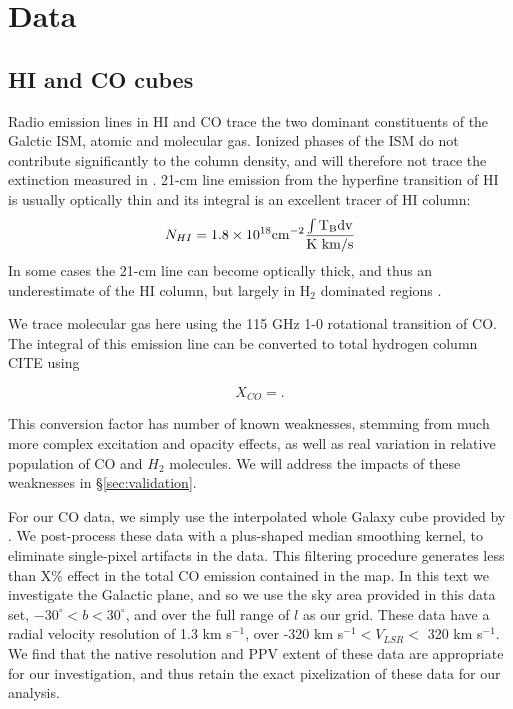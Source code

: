 \section{Data}
\label{sec:data}
\subsection{HI and CO cubes}

Radio emission lines in HI and CO trace the two dominant constituents of the Galctic ISM, atomic and molecular gas. Ionized phases of the ISM do not contribute significantly to the column density, and will therefore not trace the extinction measured in \cite{Green_2015}. 21-cm line emission from the hyperfine transition of HI is usually optically thin and its integral is an excellent tracer of HI column:
\begin{equation}\label{XHI}
N_{HI} = 1.8 \times 10^{18} \rm cm^{-2} \frac{ \int T_B dv}{\rm K~km/s}
\end{equation}
In some cases the 21-cm line can become optically thick, and thus an underestimate of the HI column, but largely in H$_2$ dominated regions \cite{Goldsmith_2007}. 

We trace molecular gas here using the 115 GHz 1-0 rotational transition of CO. The integral of this emission line can be converted to total hydrogen column CITE using

\begin{equation}\label{XCO}
X_{CO} = .
\end{equation}

This conversion factor has number of known weaknesses, stemming from much more complex excitation and opacity effects, as well as real variation in relative population of CO and $H_2$ molecules. We will address the impacts of these weaknesses in \S \ref{sec:validation}. 

For our CO data, we simply use the interpolated whole Galaxy cube provided by \cite{Dame_2001}. We post-process these data with a plus-shaped median smoothing kernel, to eliminate single-pixel artifacts in the data. This filtering procedure generates less than X\% effect in the total CO emission contained in the map. In this text we investigate the Galactic plane, and so we use the sky area provided in this data set, $-30^\circ < b < 30^\circ$, and over the full range of $l$ as our grid. These data have a radial velocity resolution of 1.3 km s$^{-1}$, over -320 km s$^{-1} < V_{LSR} <$ 320 km s$^{-1}$. We find that the native resolution and PPV extent of these data are appropriate for our investigation, and thus retain the exact pixelization of these data for our analysis. 

